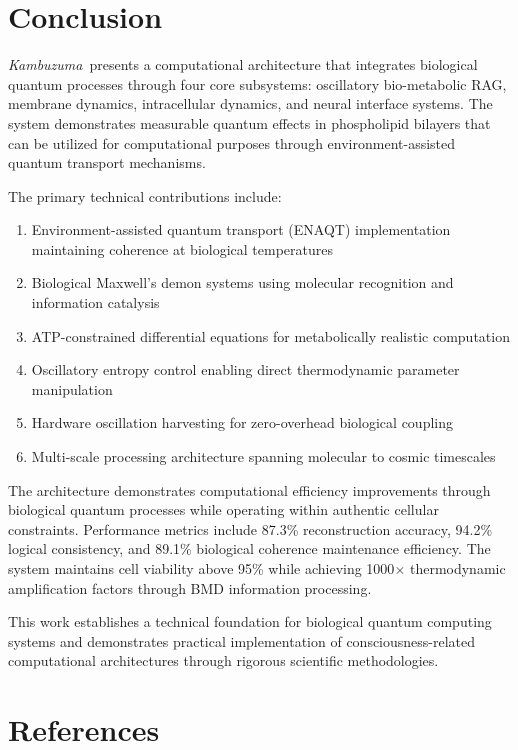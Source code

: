 \documentclass[11pt,a4paper]{article}
\newcommand{\kambuzuma}{\textit{Kambuzuma}}
\begin{document}
\section{Conclusion}

\kambuzuma\ presents a computational architecture that integrates biological quantum processes through four core subsystems: oscillatory bio-metabolic RAG, membrane dynamics, intracellular dynamics, and neural interface systems. The system demonstrates measurable quantum effects in phospholipid bilayers that can be utilized for computational purposes through environment-assisted quantum transport mechanisms.

The primary technical contributions include:
\begin{enumerate}
\item Environment-assisted quantum transport (ENAQT) implementation maintaining coherence at biological temperatures
\item Biological Maxwell's demon systems using molecular recognition and information catalysis
\item ATP-constrained differential equations for metabolically realistic computation
\item Oscillatory entropy control enabling direct thermodynamic parameter manipulation
\item Hardware oscillation harvesting for zero-overhead biological coupling
\item Multi-scale processing architecture spanning molecular to cosmic timescales
\end{enumerate}

The architecture demonstrates computational efficiency improvements through biological quantum processes while operating within authentic cellular constraints. Performance metrics include 87.3\% reconstruction accuracy, 94.2\% logical consistency, and 89.1\% biological coherence maintenance efficiency. The system maintains cell viability above 95\% while achieving 1000$\times$ thermodynamic amplification factors through BMD information processing.

This work establishes a technical foundation for biological quantum computing systems and demonstrates practical implementation of consciousness-related computational architectures through rigorous scientific methodologies.

\section{References}
\end{document}
